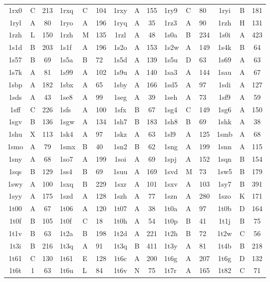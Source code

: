 \begin{longtable}{|c|c|c| a|a|a| c|c|c| a|a|a| c|c|c|}
1rx0 & C & 213 & 1rxq & C & 104 & 1rxy & A & 155 & 1ry9 & C & 80 & 1ryi & B & 181\\
1ryl & A & 80 & 1ryo & A & 196 & 1ryq & A & 35 & 1rz3 & A & 90 & 1rzh & H & 131\\
1rzh & L & 150 & 1rzh & M & 135 & 1rzl & A & 48 & 1s0a & B & 234 & 1s0i & A & 423\\
1s1d & B & 203 & 1s1f & A & 196 & 1s2o & A & 153 & 1s2w & A & 149 & 1s4k & B & 64\\
1s57 & B & 69 & 1s5a & B & 72 & 1s5d & A & 139 & 1s5u & D & 63 & 1s69 & A & 63\\
1s7k & A & 81 & 1s99 & A & 102 & 1s9u & A & 140 & 1sa3 & A & 144 & 1sau & A & 67\\
1sbp & A & 182 & 1sbx & A & 65 & 1sby & A & 166 & 1sd5 & A & 97 & 1sdi & A & 127\\
1sds & A & 43 & 1se8 & A & 99 & 1seg & A & 39 & 1seh & A & 73 & 1sf9 & A & 59\\
1sff & C & 226 & 1sfs & A & 100 & 1sfx & B & 67 & 1sg4 & C & 149 & 1sg6 & A & 150\\
1sgv & B & 136 & 1sgw & A & 134 & 1sh7 & B & 183 & 1sh8 & B & 69 & 1shk & A & 38\\
1shu & X & 113 & 1sk4 & A & 97 & 1skz & A & 63 & 1sl9 & A & 125 & 1smb & A & 68\\
1smo & A & 79 & 1smx & B & 40 & 1sn2 & B & 62 & 1sng & A & 199 & 1snn & A & 115\\
1sny & A & 68 & 1so7 & A & 199 & 1soi & A & 69 & 1spj & A & 152 & 1sqn & B & 154\\
1sqs & B & 129 & 1ss4 & B & 69 & 1suu & A & 169 & 1svd & M & 73 & 1sw5 & B & 179\\
1swy & A & 100 & 1sxq & B & 229 & 1sxr & A & 101 & 1sxv & A & 103 & 1sy7 & B & 391\\
1syy & A & 175 & 1szd & A & 128 & 1szh & A & 77 & 1szn & A & 280 & 1szo & K & 171\\
1t00 & A & 67 & 1t06 & A & 120 & 1t07 & A & 38 & 1t0a & A & 97 & 1t0b & D & 164\\
1t0f & B & 105 & 1t0f & C & 18 & 1t0h & A & 54 & 1t0p & B & 41 & 1t1j & B & 75\\
1t1v & B & 63 & 1t2a & B & 198 & 1t2d & A & 221 & 1t2h & B & 72 & 1t2w & C & 56\\
1t3i & B & 216 & 1t3q & A & 91 & 1t3q & B & 411 & 1t3y & A & 81 & 1t4b & B & 218\\
1t61 & C & 130 & 1t61 & E & 128 & 1t6c & A & 200 & 1t6g & A & 207 & 1t6g & D & 132\\
1t6t & 1 & 63 & 1t6u & L & 84 & 1t6v & N & 75 & 1t7r & A & 165 & 1t82 & C & 71\\

\end{longtable}
